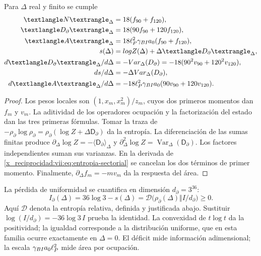 \begin{proposition}
\label{x_reciprocidad:vii:prop:respuesta-sectorial}
Para \(\Delta\) real y finito se cumple
\begin{align}
 \langle\mathsf N\rangle_\Delta&=18(f_{90}+f_{120}),\\
 \langle\mathsf D_\partial\rangle_\Delta&=18(90f_{90}+120f_{120}),\\
 \langle\widehat{\mathcal A}\rangle_\Delta
 &=18\ell_P^2\gamma_{\rm BI}a_0(f_{90}+f_{120}),\\
 s(\Delta)&=\log Z(\Delta)+\Delta\langle\mathsf D_\partial\rangle_\Delta,
 \label{x_reciprocidad:vii:eq:entropia-sectorial}\\
 \frac{\mathrm d\langle\mathsf D_\partial\rangle_\Delta}{\mathrm d\Delta}
 &=-\operatorname{Var}_\Delta(\mathsf D_\partial)
  =-18(90^2v_{90}+120^2v_{120}),\\
 \frac{\mathrm ds}{\mathrm d\Delta}
 &=-\Delta\operatorname{Var}_\Delta(\mathsf D_\partial),\\
 \frac{\mathrm d\langle\widehat{\mathcal A}\rangle_\Delta}{\mathrm d\Delta}
 &=-18\ell_P^2\gamma_{\rm BI}a_0(90v_{90}+120v_{120}).
 \label{x_reciprocidad:vii:eq:respuestas-area-entropia}
\end{align}
\end{proposition}
\begin{proof}
Los pesos locales son \((1,x_m,x_m^2)/z_m\), cuyos dos primeros
momentos dan \(f_m\) y \(v_m\). La aditividad de los operadores
ocupación y la factorización del estado dan las tres primeras fórmulas.
Tomar la traza de
\(-\rho_\partial\log\rho_\partial
=\rho_\partial(\log Z+\Delta\mathsf D_\partial)\)
da la entropía. La diferenciación de las sumas finitas produce
\(\partial_\Delta\log Z=-\langle\mathsf D_\partial\rangle_\Delta\)
y \(\partial_\Delta^2\log Z
=\operatorname{Var}_\Delta(\mathsf D_\partial)\).
Los factores independientes suman sus varianzas. En la derivada de
\eqref{x_reciprocidad:vii:eq:entropia-sectorial} se cancelan los dos términos de
primer momento. Finalmente, \(\partial_\Delta f_m=-mv_m\)
da la respuesta del área.
\end{proof}

La pérdida de uniformidad se cuantifica en dimensión \(d_\partial=3^{36}\):
\begin{equation}
 I_\partial(\Delta)
 =36\log3-s(\Delta)
 =\mathcal D\bigl(\rho_\partial(\Delta)\Vert I/d_\partial\bigr)\ge0.
 \label{x_reciprocidad:vii:eq:deficit-informacional}
\end{equation}
Aquí \(\mathcal D\) denota la entropía relativa, definida y justificada
abajo. Sustituir \(\log(I/d_\partial)=-36\log3\,I\) prueba la
identidad. La convexidad de \(t\log t\) da la positividad; la igualdad
corresponde a la distribución uniforme, que en esta familia ocurre
exactamente en \(\Delta=0\). El déficit mide información adimensional;
la escala \(\gamma_{\rm BI}a_0\ell_P^2\) mide área por ocupación.

